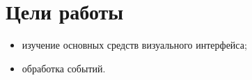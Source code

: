 \section{Цели работы}

\begin{itemize}
\item
  изучение основных средств визуального интерфейса;
\item
  обработка событий.
\end{itemize}


